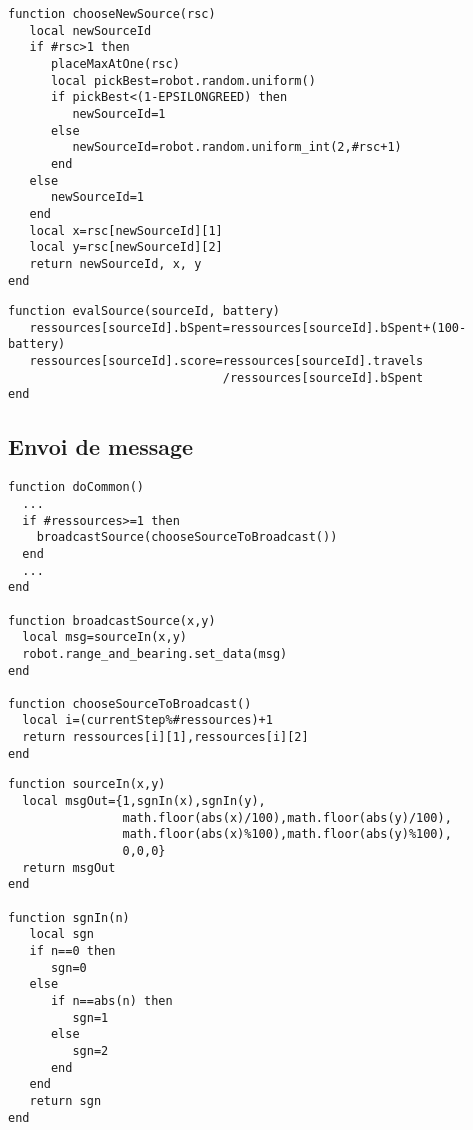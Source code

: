 \begin{subappendices}
\begin{lstlisting}[caption=Choix de la ressource à exploiter]
function chooseNewSource(rsc)
   local newSourceId
   if #rsc>1 then
      placeMaxAtOne(rsc)
      local pickBest=robot.random.uniform()
      if pickBest<(1-EPSILONGREED) then
         newSourceId=1
      else
         newSourceId=robot.random.uniform_int(2,#rsc+1)
      end
   else
      newSourceId=1
   end
   local x=rsc[newSourceId][1]
   local y=rsc[newSourceId][2]
   return newSourceId, x, y
end
\end{lstlisting}

\clearpage
\begin{lstlisting}[caption=Evaluation de la qualité de la source]
function evalSource(sourceId, battery)
   ressources[sourceId].bSpent=ressources[sourceId].bSpent+(100-battery)
   ressources[sourceId].score=ressources[sourceId].travels
                              /ressources[sourceId].bSpent
end
\end{lstlisting}


\subsection{Envoi de message}

\begin{lstlisting}[caption=Envoi d'un message différent à chaque pas]
function doCommon()
  ...
  if #ressources>=1 then
    broadcastSource(chooseSourceToBroadcast())
  end
  ...
end

function broadcastSource(x,y)
  local msg=sourceIn(x,y)
  robot.range_and_bearing.set_data(msg)
end

function chooseSourceToBroadcast()
  local i=(currentStep%#ressources)+1
  return ressources[i][1],ressources[i][2]
end
\end{lstlisting}

\begin{lstlisting}[caption=Encodage du message]
function sourceIn(x,y)
  local msgOut={1,sgnIn(x),sgnIn(y),
                math.floor(abs(x)/100),math.floor(abs(y)/100),
                math.floor(abs(x)%100),math.floor(abs(y)%100),
                0,0,0}
  return msgOut
end

function sgnIn(n)
   local sgn
   if n==0 then
      sgn=0
   else
      if n==abs(n) then
         sgn=1
      else
         sgn=2
      end
   end
   return sgn
end
\end{lstlisting}


\end{subappendices}
